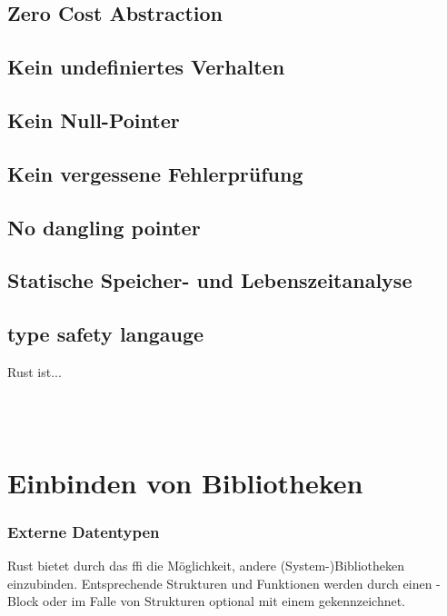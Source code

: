 \subsection{Zero Cost Abstraction}
\subsection{Kein undefiniertes Verhalten}
\subsection{Kein Null-Pointer}
\subsection{Kein vergessene Fehlerprüfung}
\subsection{No dangling pointer}
\subsection{Statische Speicher- und Lebenszeitanalyse}
\subsection{type safety langauge}





Rust ist...

 \\
 \\
\cite{rust:orly_programming}


\section{Einbinden von Bibliotheken}

\subsubsection{Externe Datentypen}
\label{rust:ffi:datatypes}

Rust bietet durch das \gls{ffi} die Möglichkeit, andere (System-)Bibliotheken einzubinden.
Entsprechende Strukturen und Funktionen werden durch einen -Block
oder im Falle von Strukturen optional mit einem \rustcinline{#[repr(C)]} gekennzeichnet.

